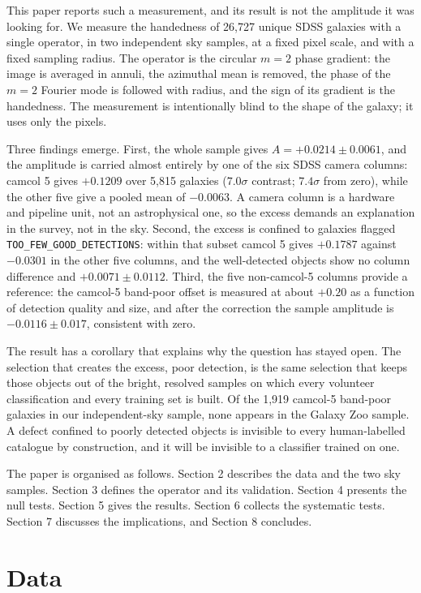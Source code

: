 \documentclass[linenumbers]{aa}
\newcommand{\toofew}{\texttt{TOO\_\allowbreak FEW\_\allowbreak GOOD\_\allowbreak DETECTIONS}}
\begin{document}
This paper reports such a measurement, and its result is not the amplitude it was looking for. We
measure the handedness of 26,727 unique SDSS galaxies with a single operator, in two independent
sky samples, at a fixed pixel scale, and with a fixed sampling radius. The operator is the
circular $m=2$ phase gradient: the image is averaged in annuli, the azimuthal mean is removed, the
phase of the $m=2$ Fourier mode is followed with radius, and the sign of its gradient is the
handedness. The measurement is intentionally blind to the shape of the galaxy; it uses only the
pixels.

Three findings emerge. First, the whole sample gives $A = +0.0214 \pm 0.0061$, and the amplitude is
carried almost entirely by one of the six SDSS camera columns: camcol 5 gives $+0.1209$ over 5,815
galaxies ($7.0\sigma$ contrast; $7.4\sigma$ from zero), while the other five give a
pooled mean of $-0.0063$. A camera column is a hardware and pipeline unit, not an astrophysical
one, so the excess demands an explanation in the survey, not in the sky. Second, the excess is
confined to galaxies flagged \toofew: within that subset camcol 5 gives
$+0.1787$ against $-0.0301$ in the other five columns, and the well-detected objects show no
column difference and $+0.0071 \pm 0.0112$. Third, the five non-camcol-5 columns provide a reference:
the camcol-5 band-poor offset is measured at about $+0.20$ as a function of detection quality and
size, and after the correction the sample amplitude is $-0.0116 \pm 0.017$, consistent with zero.

The result has a corollary that explains why the question has stayed open. The selection that
creates the excess, poor detection, is the same selection that keeps those objects out of the
bright, resolved samples on which every volunteer classification and every training set is built.
Of the 1,919 camcol-5 band-poor galaxies in our independent-sky sample, none appears in the Galaxy
Zoo sample. A defect confined to poorly detected objects is invisible to every human-labelled
catalogue by construction, and it will be invisible to a classifier trained on one.

The paper is organised as follows. Section 2 describes the data and the two sky samples. Section 3
defines the operator and its validation. Section 4 presents the null tests. Section 5 gives the
results. Section 6 collects the systematic tests. Section 7 discusses the implications, and
Section 8 concludes.

\section{Data}
\end{document}
